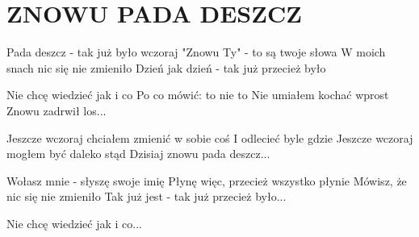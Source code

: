 \documentclass[../../../songbook.tex]{subfiles}
\begin{document}
\TabPositions{9cm} %
\section*{ZNOWU PADA DESZCZ}
{}
\vspace{0.5cm}
Pada deszcz - tak już było wczoraj	 \newline	  
"Znowu Ty" - to są twoje słowa \newline
W moich snach nic się nie zmieniło \newline
Dzień jak dzień - tak już przecież było \newline

\-\hspace{1cm} Nie chcę wiedzieć jak i co	 \newline	  
\-\hspace{1cm} Po co mówić: to nie to		 \newline	  
\-\hspace{1cm} Nie umiałem kochać wprost	 \newline	  
\-\hspace{1cm} Znowu zadrwił los...		 \newline	  

\-\hspace{1cm} Jeszcze wczoraj chciałem zmienić w sobie coś	 \newline	  
\-\hspace{1cm} I odlecieć byle gdzie \newline
\-\hspace{1cm} Jeszcze wczoraj mogłem być daleko stąd \newline
\-\hspace{1cm} Dzisiaj znowu pada deszcz...				 \newline	  

Wołasz mnie - słyszę swoje imię \newline
Płynę więc, przecież wszystko płynie \newline
Mówisz, że nic się nie zmieniło \newline
Tak już jest - tak już przecież było... \newline

\-\hspace{1cm} Nie chcę wiedzieć jak i co... \newline
\end{document}
